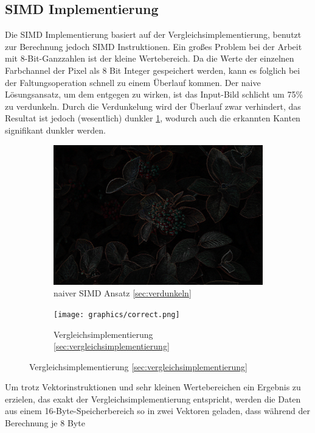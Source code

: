 \documentclass[course=erap]{aspdoc}
\begin{document}
\subsection{SIMD Implementierung}
\label{sec:simd-implementierung}
Die SIMD Implementierung basiert auf der Vergleichsimplementierung, benutzt zur Berechnung jedoch SIMD Instruktionen.
Ein großes Problem bei der Arbeit mit 8-Bit-Ganzzahlen ist der kleine Wertebereich.
Da die Werte der einzelnen Farbchannel der Pixel als 8 Bit Integer gespeichert werden, kann es folglich bei der Faltungsoperation schnell zu einem Überlauf kommen.
Der naive Lösungsansatz, um dem entgegen zu wirken, ist das Input-Bild schlicht um 75\% zu verdunkeln. \label{sec:verdunkeln}
Durch die Verdunkelung wird der Überlauf zwar verhindert, das Resultat ist jedoch (wesentlich) dunkler {\ref{fig:dark}}, wodurch auch die erkannten Kanten signifikant dunkler werden.
\begin{figure}[H]
    \begin{subfigure}{.5\columnwidth}
        \centering
        \includegraphics[width=\columnwidth]{graphics/dark.png}
        \caption{naiver SIMD Ansatz \ref{sec:verdunkeln}}
        \label{fig:dark}
    \end{subfigure}
    \begin{subfigure}{.5\columnwidth}
        \centering
        \texttt{[image: graphics/correct.png]}
        \caption{Vergleichsimplementierung \ref{sec:vergleichsimplementierung}}
        \label{fig:correct}
    \end{subfigure}
\end{figure}
Um trotz Vektorinstruktionen und sehr kleinen Wertebereichen ein Ergebnis zu erzielen,
das exakt der Vergleichsimplementierung entspricht, werden die Daten aus einem 16-Byte-Speicherbereich so in zwei Vektoren geladen, dass während der Berechnung je 8 Byte
\end{document}
